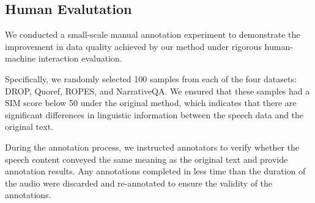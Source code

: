 \documentclass[11pt]{article}
\begin{document}
	\begin{table}[tb]
		\centering
		\caption{Results using different word embedding models on various datasets, without LLM-based rewriting. All datasets are evaluated using WER as the metric.}
		\label{table:wer}
	\end{table}

	
	\subsection{Human Evalutation}\label{appendix:human_evaluation}
	We conducted a small-scale manual annotation experiment to demonstrate the improvement in data quality achieved by our method under rigorous human-machine interaction evaluation.
	
	Specifically, we randomly selected 100 samples from each of the four datasets: DROP, Quoref, ROPES, and NarrativeQA. We ensured that these samples had a SIM score below 50 under the original method, which indicates that there are significant differences in linguistic information between the speech data and the original text.
	
	During the annotation process, we instructed annotators to verify whether the speech content conveyed the same meaning as the original text and provide annotation results. Any annotations completed in less time than the duration of the audio were discarded and re-annotated to ensure the validity of the annotations.
	
\end{document}
